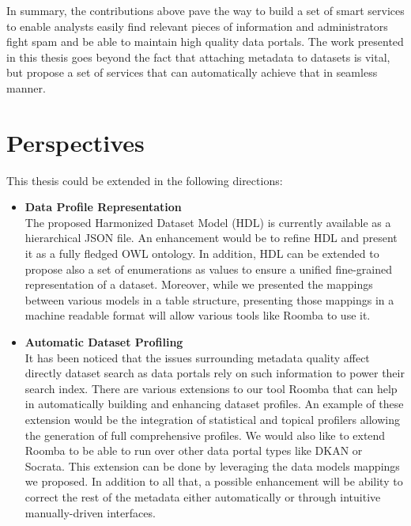 In summary, the contributions above pave the way to build a set of smart services to enable analysts easily find relevant pieces of information and administrators fight spam and be able to maintain high quality data portals. The work presented in this thesis goes beyond the fact that attaching metadata to datasets is vital, but propose a set of services that can automatically achieve that in seamless manner.

\section{Perspectives}

This thesis could be extended in the following directions:

\begin{itemize}

\item \textbf{Data Profile Representation}
\vspace{1mm}
\\
The proposed Harmonized Dataset Model (HDL) is currently available as a hierarchical JSON file. An enhancement would be to refine HDL and present it as a fully fledged OWL ontology. In addition, HDL can be extended to propose also a set of enumerations as values to ensure a unified fine-grained representation of a dataset. Moreover, while we presented the mappings between various models in a table structure, presenting those mappings in a machine readable format will allow various tools like Roomba to use it.

\item \textbf{Automatic Dataset Profiling}
\vspace{1mm}
\\
It has been noticed that the issues surrounding metadata quality affect directly dataset search as data portals rely on such information to power their search index. There are various extensions to our tool Roomba that can help in automatically building and enhancing dataset profiles. An example of these extension would be the integration of statistical and topical profilers allowing the generation of full comprehensive profiles. We would also like to extend Roomba to be able to run over other data portal types like DKAN or Socrata. This extension can be done by leveraging the data models mappings we proposed. In addition to all that, a possible enhancement will be ability to correct the rest of the metadata either automatically or through intuitive manually-driven interfaces.


\end{itemize}
